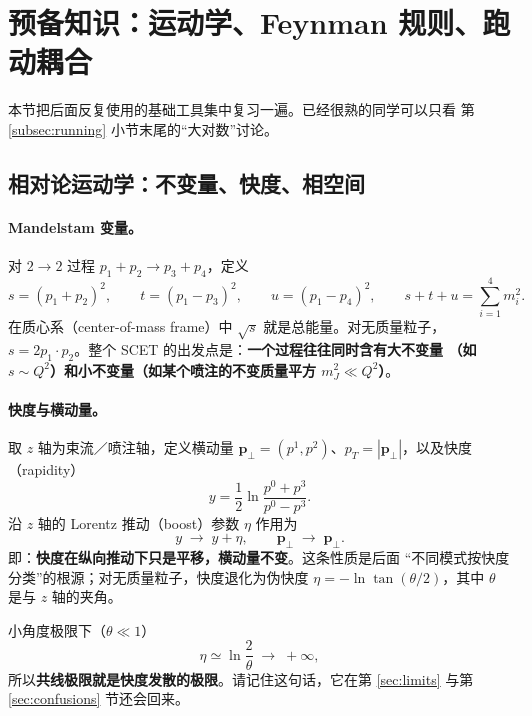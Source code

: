 \documentclass[UTF8,a4paper,11pt]{ctexart}
\theoremstyle{definition}
\theoremstyle{remark}
\theoremstyle{plain}
\newcommand{\pperp}{\bm{p}_\perp}
\newcommand{\en}[1]{\textsf{#1}}   %
\begin{document}
\section{预备知识：运动学、Feynman 规则、跑动耦合}
\label{sec:prelim}

本节把后面反复使用的基础工具集中复习一遍。已经很熟的同学可以只看
第 \ref{subsec:running} 小节末尾的“大对数”讨论。

\subsection{相对论运动学：不变量、快度、相空间}
\label{subsec:kinematics}

\paragraph{Mandelstam 变量。}
对 $2\to2$ 过程 $p_1+p_2\to p_3+p_4$，定义
\begin{equation}
  s=(p_1+p_2)^2,\qquad t=(p_1-p_3)^2,\qquad u=(p_1-p_4)^2,
  \qquad s+t+u=\sum_{i=1}^{4}m_i^2 .
\end{equation}
在质心系（\en{center-of-mass frame}）中 $\sqrt s$ 就是总能量。对无质量粒子，
$s=2p_1\cdot p_2$。整个 SCET 的出发点是：\textbf{一个过程往往同时含有大不变量
（如 $s\sim Q^2$）和小不变量（如某个喷注的不变质量平方 $m_J^2\ll Q^2$）}。

\paragraph{快度与横动量。}
取 $z$ 轴为束流／喷注轴，定义横动量
$\pperp=(p^1,p^2)$、$p_T=|\pperp|$，以及快度（\en{rapidity}）
\begin{equation}
  y=\frac12\ln\frac{p^0+p^3}{p^0-p^3} .
  \label{eq:rapidity}
\end{equation}
沿 $z$ 轴的 Lorentz 推动（\en{boost}）参数 $\eta$ 作用为
\begin{equation}
  y \;\longrightarrow\; y+\eta ,
  \qquad
  \pperp \;\longrightarrow\; \pperp .
\end{equation}
即：\textbf{快度在纵向推动下只是平移，横动量不变}。这条性质是后面
“不同模式按快度分类”的根源；对无质量粒子，快度退化为伪快度
$\eta=-\ln\tan(\theta/2)$，其中 $\theta$ 是与 $z$ 轴的夹角。

小角度极限下（$\theta\ll1$）
\begin{equation}
  \eta \simeq \ln\frac{2}{\theta}\;\longrightarrow\;+\infty ,
\end{equation}
所以\textbf{共线极限就是快度发散的极限}。请记住这句话，它在第 \ref{sec:limits}
与第 \ref{sec:confusions} 节还会回来。
\end{document}
